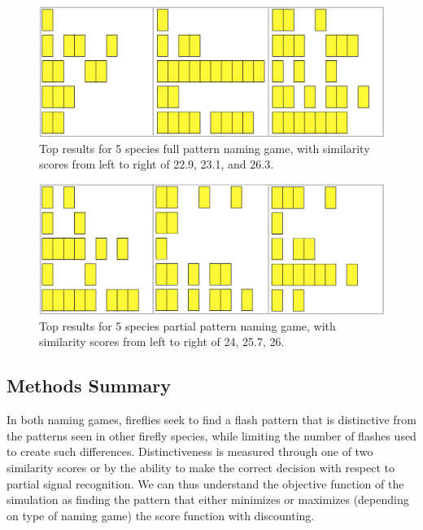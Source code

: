 \begin{figure}[h]
\includegraphics[width = \columnwidth]{./pictures/5_lcs_one/all.png}
\caption{Top results for 5 species full pattern naming game, with similarity scores from left to right of 22.9, 23.1, and 26.3.}
\end{figure} 

\begin{figure}[h]
\includegraphics[width = \columnwidth]{./pictures/5_lcs_two/all.png}
\caption{Top results for 5 species partial pattern naming game, with similarity scores from left to right of 24, 25.7, 26.}
\end{figure}   
\subsection{Methods Summary}
In both naming games, fireflies seek to find a flash pattern that is distinctive from the patterns seen in other firefly species, while limiting the number of flashes used to create such differences.
Distinctiveness is measured through one of two similarity scores or by the ability to make the correct decision with respect to partial signal recognition.
We can thus understand the objective function of the simulation as finding the pattern that either minimizes or maximizes (depending on type of naming game) the score function with discounting. 
